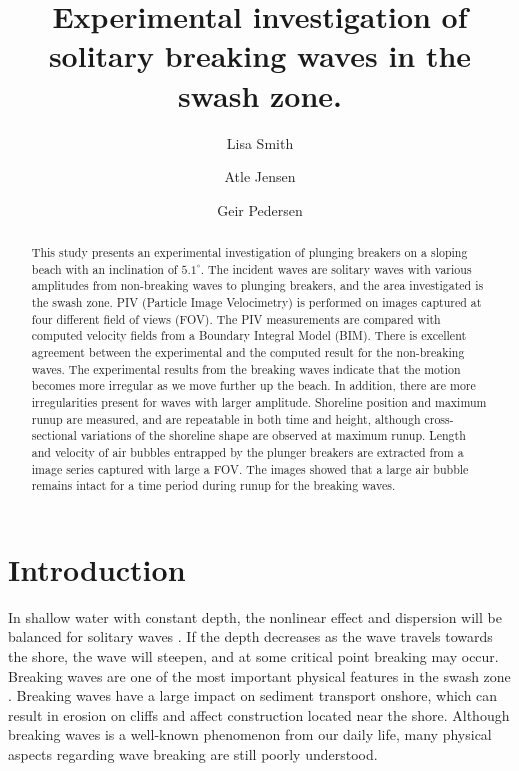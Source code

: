 \documentclass[a4paper, 11pt, english, twoside, openright]{article}
\title{Experimental investigation of solitary breaking waves in the swash zone. }
\author[1]{Lisa Smith}
\author[1]{Atle Jensen}
\author[1]{Geir Pedersen}
\affil[1]{ Department of Mathematics, University of Oslo, Norway}
\begin{document}
\maketitle


\setlength{\marginparwidth}{2cm}

\begin{abstract}
This study presents an experimental investigation of plunging breakers on a sloping beach with an inclination of $5.1^{\circ}$. The incident waves are solitary waves with various amplitudes from non-breaking waves to plunging breakers, and the area investigated is the swash zone. PIV (Particle Image Velocimetry) is performed on images captured at four different field of views (FOV). The PIV measurements are compared with computed velocity fields from a Boundary Integral Model (BIM). 
There is excellent agreement between the experimental and the computed result for the non-breaking waves. The experimental results from the breaking waves indicate that the motion becomes more irregular as we move further up the beach. In addition, there are more irregularities present  for waves with larger amplitude. Shoreline position and maximum runup are measured, and are repeatable in both time and height, although  cross-sectional variations of the shoreline shape are observed at maximum runup.  Length and velocity of air bubbles entrapped by the plunger breakers are extracted from a image series captured with large a FOV. The images showed that a large air bubble remains intact for a time period during runup for the breaking waves.
\end{abstract}

\section{Introduction}
In shallow water with constant depth, the nonlinear effect and dispersion will be balanced for solitary waves \citep{peregrine1983breaking}. If the depth decreases as the wave travels towards the shore, the wave will steepen, and at some critical  point breaking may occur. Breaking waves are one of the most important physical features in the swash zone \citep{elfrink2002hydrodynamics}. Breaking waves have a large impact on sediment transport onshore, which can result in erosion on cliffs and affect construction located near the shore. Although breaking waves is a well-known phenomenon from our daily life, many physical aspects regarding wave breaking are still poorly understood.
\end{document}
